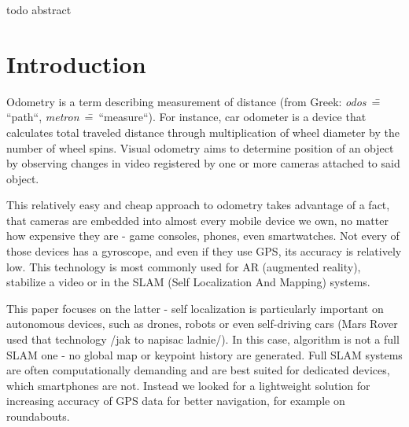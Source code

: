 todo abstract

\chapter*{Introduction}

Odometry is a term describing measurement of distance (from Greek: \textit{odos}~\==~ ``path``, \textit{metron}~\==~``measure``). For instance, car odometer is a device that calculates total traveled distance through multiplication of wheel diameter by the number of wheel spins. Visual odometry aims to determine position of an object by observing changes in video registered by one or more cameras attached to said object.


This relatively easy and cheap approach to odometry takes advantage of a fact, that cameras are embedded into almost every mobile device we own, no matter how expensive they are - game consoles, phones, even smartwatches. Not every of those devices has a gyroscope, and even if they use GPS, its accuracy is relatively low. This technology is most commonly used for AR (augmented reality), stabilize a video or in the SLAM (Self Localization And Mapping) systems.

This paper focuses on the latter - self localization is particularly important on autonomous devices, such as drones, robots or even self-driving cars (Mars Rover used that technology /jak to napisac ladnie/). In this case, algorithm is not a full SLAM one - no global map or keypoint history are generated.
Full SLAM systems are often computationally demanding and are best suited for dedicated devices, which smartphones are not. Instead we looked for a lightweight solution for increasing accuracy of GPS data for better navigation, for example on roundabouts.

